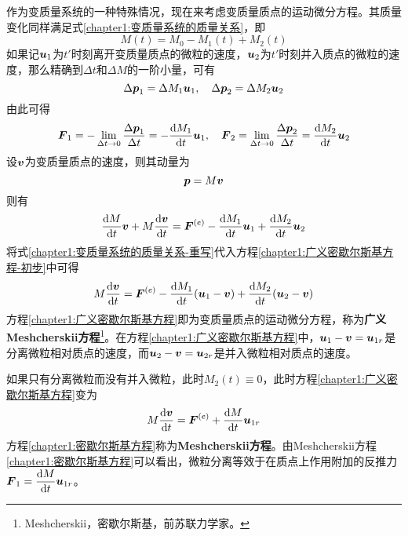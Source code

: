 作为变质量系统的一种特殊情况，现在来考虑变质量质点的运动微分方程。其质量变化同样满足式\eqref{chapter1:变质量系统的质量关系}，即
\begin{equation}
	M(t) = M_0 - M_1(t) + M_2(t)
	\label{chapter1:变质量系统的质量关系-重写}
\end{equation}
如果记$\boldsymbol{u}_1$为$t'$时刻离开变质量质点的微粒的速度，$\boldsymbol{u}_2$为$t'$时刻并入质点的微粒的速度，那么精确到$\Delta t$和$\Delta M$的一阶小量，可有
\begin{equation}
	\Delta \boldsymbol{p}_1 = \Delta M_1\boldsymbol{u}_1,\quad \Delta \boldsymbol{p}_2 = \Delta M_2\boldsymbol{u}_2
\end{equation}	
由此可得
\begin{equation}
	\boldsymbol{F}_1 = -\lim_{\Delta t\to 0} \frac{\Delta \boldsymbol{p}_1}{\Delta t} = -\dfrac{\mathrm{d} M_1}{\mathrm{d} t}\boldsymbol{u}_1,\quad \boldsymbol{F}_2 = \lim_{\Delta t\to 0} \frac{\Delta \boldsymbol{p}_2}{\Delta t} = \dfrac{\mathrm{d} M_2}{\mathrm{d} t}\boldsymbol{u}_2
\end{equation}
设$\boldsymbol{v}$为变质量质点的速度，则其动量为
\begin{equation}
	\boldsymbol{p} = M\boldsymbol{v}
\end{equation}
则有
\begin{equation}
	\dfrac{\mathrm{d} M}{\mathrm{d} t}\boldsymbol{v}+M\dfrac{\mathrm{d} \boldsymbol{v}}{\mathrm{d} t} = \boldsymbol{F}^{(e)} - \dfrac{\mathrm{d} M_1}{\mathrm{d} t}\boldsymbol{u}_1 + \dfrac{\mathrm{d} M_2}{\mathrm{d} t}\boldsymbol{u}_2
	\label{chapter1:广义密歇尔斯基方程-初步}
\end{equation}
将式\eqref{chapter1:变质量系统的质量关系-重写}代入方程\eqref{chapter1:广义密歇尔斯基方程-初步}中可得
\begin{equation}
	M\dfrac{\mathrm{d} \boldsymbol{v}}{\mathrm{d} t} = \boldsymbol{F}^{(e)} - \dfrac{\mathrm{d} M_1}{\mathrm{d} t}(\boldsymbol{u}_1-\boldsymbol{v}) + \dfrac{\mathrm{d} M_2}{\mathrm{d} t}(\boldsymbol{u}_2-\boldsymbol{v})
	\label{chapter1:广义密歇尔斯基方程}
\end{equation}
方程\eqref{chapter1:广义密歇尔斯基方程}即为变质量质点的运动微分方程，称为{\bf 广义Meshcherskii方程}\footnote{Meshcherskii，密歇尔斯基，前苏联力学家。}。在方程\eqref{chapter1:广义密歇尔斯基方程}中，$\boldsymbol{u}_1-\boldsymbol{v}=\boldsymbol{u}_{1r}$是分离微粒相对质点的速度，而$\boldsymbol{u}_2-\boldsymbol{v}=\boldsymbol{u}_{2r}$是并入微粒相对质点的速度。

如果只有分离微粒而没有并入微粒，此时$M_2(t)\equiv 0$，此时方程\eqref{chapter1:广义密歇尔斯基方程}变为
\begin{equation}
	M\dfrac{\mathrm{d} \boldsymbol{v}}{\mathrm{d} t} = \boldsymbol{F}^{(e)} + \dfrac{\mathrm{d} M}{\mathrm{d} t}\boldsymbol{u}_{1r}
	\label{chapter1:密歇尔斯基方程}
\end{equation}
方程\eqref{chapter1:密歇尔斯基方程}称为{\bf Meshcherskii方程}。由Meshcherskii方程\eqref{chapter1:密歇尔斯基方程}可以看出，微粒分离等效于在质点上作用附加的反推力$\boldsymbol{F}_1 = \dfrac{\mathrm{d} M}{\mathrm{d} t}\boldsymbol{u}_{1r}$。

